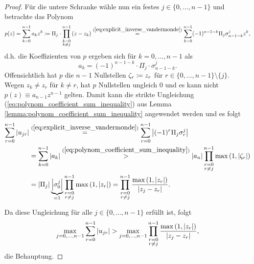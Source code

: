 \begin{proof}
    \noindent Für die untere Schranke wähle nun ein festes
    $j \in \{0, \dots, n-1\}$ und betrachte das Polynom
    \[
        p(z) = \sum_{k=0}^{n-1} a_k z^k
        \coloneqq \Pi_j \cdot \prod_{\substack{k=0\\ k \neq j}}^{n-1} \left( z - z_k \right)
        \overset{(\ref{eq:explicit_inverse_vandermonde})}{=} \sum_{k=0}^{n-1} (-1)^{n-1-k} \Pi_j \sigma_{n-1-k}^j z^k,
    \]
    d.h. die Koeffizienten von $p$ ergeben sich für $k = 0, \dots, n-1$ als
    \[
        a_k = (-1)^{n-1-k} \cdot \Pi_j \cdot \sigma_{n-1-k}^j.
    \]
    Offensichtlich hat $p$ die $n-1$ Nullstellen
    $\zeta_r \coloneqq z_r$ für $r \in \{0,\dots,n-1\} \setminus \{j\}$.
    Wegen $z_k \neq z_r$ für $k \neq r$, hat $p$ Nullstellen ungleich $0$ und
    es kann nicht $p(z) \equiv a_{n-1} z^{n-1}$ gelten.
    Damit kann die strikte Ungleichung
    (\ref{eq:polynom_coefficient_sum_inequality}) aus Lemma
    \ref{lemma:polynom_coefficient_sum_inequality} angewendet werden und es
    folgt
    \[
        \begin{split}
            \sum_{r=0}^{n-1} \left\lvert u_{jr} \right\rvert
            &\overset{(\ref{eq:explicit_inverse_vandermonde})}{=}
                \sum_{r=0}^{n-1} \left\lvert (-1)^r \Pi_j \sigma_r^j \right\rvert\\
            &= \sum_{k=0}^{n-1} \left\lvert a_k \right\rvert
            \overset{(\ref{eq:polynom_coefficient_sum_inequality})}{>}
                \left\lvert a_{n} \right\rvert \prod_{\substack{r=0\\ r \neq j}}^{n-1} \max \left(1, \left\lvert \zeta_r \right\rvert \right)\\
            &= \left\lvert \Pi_j \right\rvert \underbrace{\left\lvert \sigma_0^j \right\rvert}_{=1} \prod_{\substack{r=0\\ r \neq j}}^{n-1} \max \left(1, \left\lvert z_r \right\rvert \right)
            = \prod_{\substack{r=0\\ r \neq j}}^{n-1} \frac{\max \left(1, \left\lvert z_r \right\rvert \right)}{\left\lvert z_j - z_r \right\rvert}.
        \end{split}
    \]

    \noindent Da diese Ungleichung für alle $j \in \{0, \dots, n-1\}$ erfüllt ist, folgt
    \[
        \max_{j = 0, \dots, n-1} \sum_{r=0}^{n-1} \left\lvert u_{jr} \right\rvert
        > \max_{j = 0, \dots, n-1} \prod_{\substack{r=0\\ r \neq j}}^{n-1} \frac{\max \left(1, \left\lvert z_r \right\rvert \right)}{\left\lvert z_j - z_r \right\rvert},
    \]
    die Behauptung.
\end{proof}

